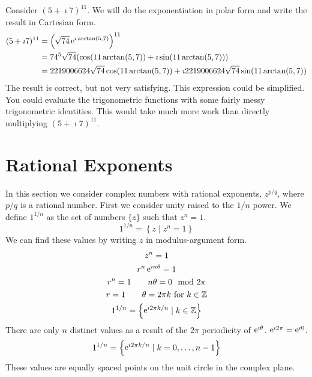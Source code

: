 \begin{Example}
  Consider $(5 + \imath 7)^{11}$.  We will do the exponentiation in polar form and
  write the result in Cartesian form.
  \begin{align*}
    (5 + \imath 7)^{11}
    &= \left( \sqrt{74} \mathop{\mathrm{e}}\nolimits^{\imath \arctan(5,7)} \right)^{11} \\
    &= 74^5 \sqrt{74} ( \cos( 11 \arctan(5,7)) 
    + \imath \sin( 11 \arctan(5,7)))\\
    &= 2219006624 \sqrt{74} \cos( 11 \arctan(5,7))
    + \imath 2219006624 \sqrt{74} \sin( 11 \arctan(5,7))
  \end{align*}
  The result is correct, but not very satisfying.
  This expression could be simplified.
  You could evaluate the trigonometric functions with some fairly messy
  trigonometric identities.  This would take much more work than directly 
  multiplying $(5 + \imath 7)^{11}$.
\end{Example}












\section{Rational Exponents}





In this section we consider complex numbers with rational exponents,
$z^{p/q}$, where $p/q$ is a rational number.  First we consider unity 
raised to the $1/n$ power.   We define $1^{1/n}$ as the set of numbers
$\{z\}$ such that $z^n = 1$.
\[
1^{1/n} = \left\{ z \mid z^n = 1 \right\}
\]
We can find these values by writing $z$ in modulus-argument form.
\begin{gather*}
  z^n = 1 
  \\
  r^n \mathop{\mathrm{e}}\nolimits^{\imath n \theta} = 1 
  \\
  r^n = 1 \qquad n \theta = 0 \mod 2 \pi 
  \\
  r = 1 \qquad \theta = 2 \pi k\ \mathrm{for}\ k \in \mathbb{Z}
  \\
  1^{1/n} = \left\{ \mathop{\mathrm{e}}\nolimits^{\imath 2 \pi k/n} \mid k \in \mathbb{Z} \right\} 
\end{gather*}
There are only $n$ distinct values as a result of the $2 \pi$ periodicity 
of $\mathop{\mathrm{e}}\nolimits^{\imath \theta}$. $\mathop{\mathrm{e}}\nolimits^{\imath 2 \pi} = \mathop{\mathrm{e}}\nolimits^{\imath 0}$.
\[
1^{1/n} = \left\{ \mathop{\mathrm{e}}\nolimits^{\imath 2 \pi k / n} \mid k = 0, \ldots, n-1 \right\}
\]
These values are equally spaced points on the unit circle in the 
complex plane.



